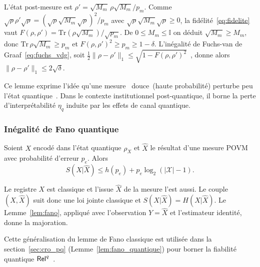 \begin{sloppypar}
\begin{Preuve}
L'\'etat post-mesure est $\rho' = \sqrt{M_m}\,\rho\sqrt{M_m}/p_m$. Comme
$\sqrt{\rho}\rho'\sqrt{\rho} = (\sqrt{\rho}\sqrt{M_m}\sqrt{\rho})^2/p_m$ avec
$\sqrt{\rho}\sqrt{M_m}\sqrt{\rho} \geq 0$, la fid\'elit\'e~\eqref{eq:fidelite} vaut
$F(\rho,\rho') = \mathrm{Tr}(\rho\sqrt{M_m})/\sqrt{p_m}$. De $0 \leq M_m \leq \mathbb{I}$
on d\'eduit $\sqrt{M_m} \geq M_m$, donc $\mathrm{Tr}\,\rho\sqrt{M_m} \geq p_m$ et
$F(\rho,\rho')^2 \geq p_m \geq 1 - \delta$. L'in\'egalit\'e de Fuchs-van de Graaf~\eqref{eq:fuchs_vdg}, soit
$\tfrac12\|\rho - \rho'\|_1 \leq \sqrt{1 - F(\rho,\rho')^2}$~\cite{Wilde2017}, donne
alors $\|\rho - \rho'\|_1 \leq 2\sqrt{\delta}$.
\end{Preuve}

Ce lemme exprime l'id\'ee qu'une mesure \guillemotleft~douce~\guillemotright (haute probabilit\'e) perturbe
peu l'\'etat quantique~\cite{OgawaNagaoka}. Dans le contexte institutionnel post-quantique, il borne
la perte d'interpr\'etabilit\'e $\eta_q$ induite par les effets de canal quantique.

\subsubsection{In\'egalit\'e de Fano quantique}
\label{subsubsec:fano_quantique}

\begin{lemma}\label{lem:fano_quantique_etat_art}
Soient $X$ encod\'e dans l'\'etat quantique $\rho_X$ et $\hat{X}$ le r\'esultat d'une
mesure POVM avec probabilit\'e d'erreur $p_e$. Alors
\begin{equation}
S(X|\hat{X}) \leq h(p_e) + p_e \log_2(|\mathcal{X}| - 1).
\label{eq:qfano}
\end{equation}
\end{lemma}

\begin{Preuve}
Le registre $X$ est classique et l'issue $\hat X$ de la mesure l'est aussi. Le
couple $(X,\hat X)$ suit donc une loi jointe classique et
$S(X|\hat X) = H(X|\hat X)$. Le Lemme~\ref{lem:fano}, appliqu\'e avec
l'observation $Y = \hat X$ et l'estimateur identit\'e, donne la majoration.
\end{Preuve}

Cette g\'en\'eralisation du lemme de Fano classique est utilis\'ee dans la section~\ref{sec:cro_pq} (Lemme~\ref{lem:fano_quantique}) pour borner la fiabilit\'e quantique $\mathsf{Rel}^q$~\cite{Hayashi}.


\end{sloppypar}
